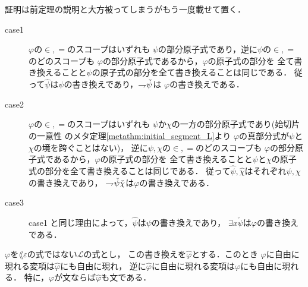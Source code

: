 	\begin{metaprf}
		証明は前定理の説明と大方被ってしまうがもう一度載せて置く．
		\begin{description}
			\item[case1] $\varphi$の$\in,=$のスコープはいずれも
				$\psi$の部分原子式であり，逆に$\psi$の$\in,=$のどのスコープも
				$\varphi$の部分原子式であるから，$\varphi$の原子式の部分を
				全て書き換えることと$\psi$の原子式の部分を全て書き換えることは同じである．
				従って$\widehat{\psi}$は$\psi$の書き換えであり，$\rightharpoondown\hspace{-0.25em} \check{\psi}$は
				$\varphi$の書き換えである．
			
			\item[case2] $\varphi$の$\in,=$のスコープはいずれも
				$\psi$か$\chi$の一方の部分原子式であり(始切片の一意性
				のメタ定理\ref{metathm:initial_segment_L}より
				$\varphi$の真部分式が$\psi$と$\chi$の境を跨ぐことはない)，
				逆に$\psi,\chi$の$\in,=$のどのスコープも
				$\varphi$の部分原子式であるから，$\varphi$の原子式の部分を
				全て書き換えることと$\psi$と$\chi$の原子式の部分を全て書き換えることは同じである．
				従って$\widehat{\psi},\widehat{\chi}$はそれぞれ$\psi,\chi$の書き換えであり，
				$\rightharpoondown\hspace{-0.25em} \check{\psi} \check{\chi}$は$\varphi$の書き換えである．
				
			\item[case3] case1 と同じ理由によって，$\widehat{\psi}$は$\psi$の書き換えであり，
				$\exists x \check{\psi}$は$\varphi$の書き換えである．
				\QED
		\end{description}
	\end{metaprf}
	
	\begin{screen}
		\begin{metathm}[書き換え後も自由な変項は増減しない]
		\label{metathm:variables_unchanged_after_rewriting}
			$\varphi$を$\lang{\varepsilon}$の式ではない$\mathcal{L}$の式とし，
			この書き換えを$\widehat{\varphi}$とする．このとき
			$\varphi$に自由に現れる変項は$\widehat{\varphi}$にも自由に現れ，
			逆に$\widehat{\varphi}$に自由に現れる変項は$\varphi$にも自由に現れる．
			特に，$\varphi$が文ならば$\widehat{\varphi}$も文である．
		\end{metathm}
	\end{screen}
	
